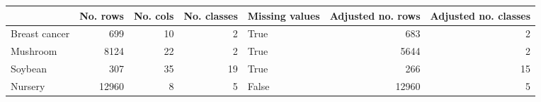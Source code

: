 \begin{tabular}{lrrrlrr}
\toprule
{} &  No. rows &  No. cols &  No. classes &  Missing values &  Adjusted no. rows &  Adjusted no. classes \\
\midrule
Breast cancer &       699 &        10 &            2 &            True &                683 &                     2 \\
Mushroom      &      8124 &        22 &            2 &            True &               5644 &                     2 \\
Soybean       &       307 &        35 &           19 &            True &                266 &                    15 \\
Nursery       &     12960 &         8 &            5 &           False &              12960 &                     5 \\
\bottomrule
\end{tabular}
